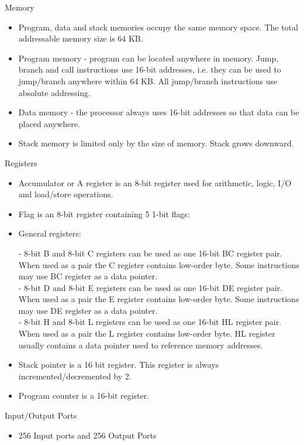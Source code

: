 \documentclass[conference]{IEEEtran}
\begin{document}
{\large Memory}
\begin{itemize}
\item Program, data and stack memories occupy the same memory space. The total addressable memory size is 64 KB.

\item Program memory - program can be located anywhere in memory. Jump, branch and call instructions use 16-bit addresses, i.e. they can be used to jump/branch anywhere within 64 KB. All jump/branch instructions use absolute addressing.

\item Data memory - the processor always uses 16-bit addresses so that data can be placed anywhere.

\item Stack memory is limited only by the size of memory. Stack grows downward.\\
\end{itemize}
{\large Registers}
\begin{itemize}

\item Accumulator or A register is an 8-bit register used for arithmetic, logic, I/O and load/store operations.\\

\item Flag is an 8-bit register containing 5 1-bit flags:\\


\item {\small General registers:}

    - 8-bit B and 8-bit C registers can be used as one 16-bit BC register pair. When used as a pair the C register contains low-order byte. Some instructions may use BC register as a data pointer.\\
    - 8-bit D and 8-bit E registers can be used as one 16-bit DE register pair. When used as a pair the E register contains low-order byte. Some instructions may use DE register as a data pointer.\\
    - 8-bit H and 8-bit L registers can be used as one 16-bit HL register pair. When used as a pair the L register contains low-order byte. HL register usually contains a data pointer used to reference memory addresses.\\

\item Stack pointer is a 16 bit register. This register is always incremented/decremented by 2.\\

\item Program counter is a 16-bit register.\\
\end{itemize}
{\large Input/Output Ports}
\begin{itemize}
\item 256 Input ports and 256 Output Ports\\
\end{itemize}
\end{document}
